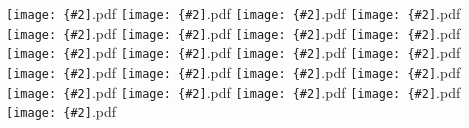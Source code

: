\documentclass[12pt,a4paper]{article}
\newcommand{\pdffig}[2][0.5]{\texttt{[image: \{\#2]}.pdf}}
\begin{document}
\pdffig[0.5]{Correlation_SthSthAm_tsfc_precip.mon}
\pdffig[0.5]{Correlation_SthSthAm_tsfc_rhum.mon}
\pdffig[0.5]{Correlation_SthSthAm_tsfc_sfc_temp.mon}
\pdffig[0.5]{Correlation_SthSthAm_tsfc_shf.mon}
\pdffig[0.5]{Correlation_SthSthAm_tsfc_smc.mon}
\pdffig[0.5]{Correlation_TropAfr_tsfc_dlwr.mon}
\pdffig[0.5]{Correlation_TropAfr_tsfc_dswr.mon}
\pdffig[0.5]{Correlation_TropAfr_tsfc_lhf.mon}
\pdffig[0.5]{Correlation_TropAfr_tsfc_precip.mon}
\pdffig[0.5]{Correlation_TropAfr_tsfc_rhum.mon}
\pdffig[0.5]{Correlation_TropAfr_tsfc_sfc_temp.mon}
\pdffig[0.5]{Correlation_TropAfr_tsfc_shf.mon}
\pdffig[0.5]{Correlation_TropAfr_tsfc_smc.mon}
\pdffig[0.5]{Correlation_TropSthAm_tsfc_dlwr.mon}
\pdffig[0.5]{Correlation_TropSthAm_tsfc_dswr.mon}
\pdffig[0.5]{Correlation_TropSthAm_tsfc_lhf.mon}
\pdffig[0.5]{Correlation_TropSthAm_tsfc_precip.mon}
\pdffig[0.5]{Correlation_TropSthAm_tsfc_rhum.mon}
\pdffig[0.5]{Correlation_TropSthAm_tsfc_sfc_temp.mon}
\pdffig[0.5]{Correlation_TropSthAm_tsfc_shf.mon}
\pdffig[0.5]{Correlation_TropSthAm_tsfc_smc.mon}
\end{document}
